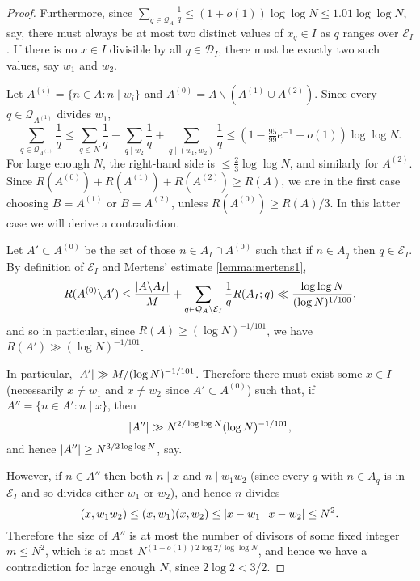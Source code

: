 \begin{proof}
Furthermore, since $\sum_{q\in\mathcal{Q}_A}\frac{1}{q}\leq (1+o(1))\log\log N\leq 1.01\log\log N$, say, there must always be at most two distinct values of $x_q\in I$ as $q$ ranges over $\mathcal{E}_I$. If there is no $x\in I$ divisible by all $q\in\mathcal{D}_I$, there must be exactly two such values, say $w_1$ and $w_2$.

Let $A^{(i)}=\{n\in A: n\mid w_i\}$ and $A^{(0)}=A\backslash (A^{(1)}\cup A^{(2)})$. Since every $q\in\mathcal{Q}_{A^{(1)}}$ divides $w_1$,
\[\sum_{q\in \mathcal{Q}_{A^{(1)}}}\frac{1}{q}\leq \sum_{q\leq N}\frac{1}{q}- \sum_{q\mid w_2}\frac{1}{q}+ \sum_{q\mid (w_1,w_2)}\frac{1}{q}\leq (1-\tfrac{95}{99}e^{-1}+o(1))\log\log N.\]
For large enough $N$, the right-hand side is $\leq \frac{2}{3}\log\log N$, and similarly for $A^{(2)}$. Since $R(A^{(0)})+R(A^{(1)})+R(A^{(2)})\geq R(A)$, we are in the first case choosing $B=A^{(1)}$ or $B=A^{(2)}$, unless $R(A^{(0)})\geq R(A)/3$. In this latter case we will derive a contradiction.

Let $A'\subset A^{(0)}$ be the set of those $n\in A_I\cap A^{(0)}$ such that if $n\in A_q$ then $q\in\mathcal{E}_I$. By definition of $\mathcal{E}_I$ and Mertens' estimate \ref{lemma:mertens1},
\[R(A^{(0)}\backslash A')\leq \frac{\left\lvert A\backslash A_I\right\rvert}{M}+\sum_{q\in\mathcal{Q}_A\backslash \mathcal{E}_I}\frac{1}{q}R(A_I;q)\ll \frac{\log\log N}{(\log N)^{1/100}},\]
and so  in particular, since $R(A)\geq (\log N)^{-1/101}$, we have $R(A')\gg (\log N)^{-1/101}$.

In particular, $\left\lvert A'\right\rvert\gg M/(\log N)^{-1/101}$. Therefore there must exist some $x\in I$ (necessarily $x\neq w_1$ and $x\neq w_2$ since $A'\subset A^{(0)}$) such that, if $A''=\{ n\in A' : n\mid x\}$, then
\[\left\lvert A''\right\rvert\gg N^{2/\log\log N}(\log N)^{-1/101},\]
and hence $\left\lvert A''\right\rvert\geq N^{3/2\log\log N}$, say.

However, if $n\in A''$ then both $n\mid x$ and $n\mid w_1w_2$ (since every $q$ with $n\in A_q$ is in $\mathcal{E}_I$ and so divides either $w_1$ or $w_2$), and hence $n$ divides
\[(x,w_1w_2)\leq (x,w_1)(x,w_2)\leq \left\lvert x-w_1\right\rvert\left\lvert x-w_2\right\rvert\leq N^2.\]
Therefore the size of $A''$ is at most the number of divisors of some fixed integer $m\leq N^2$, which is at most $N^{(1+o(1))2\log 2/\log\log N}$, and hence we have a contradiction for large enough $N$, since $2\log 2< 3/2$.
\end{proof}


